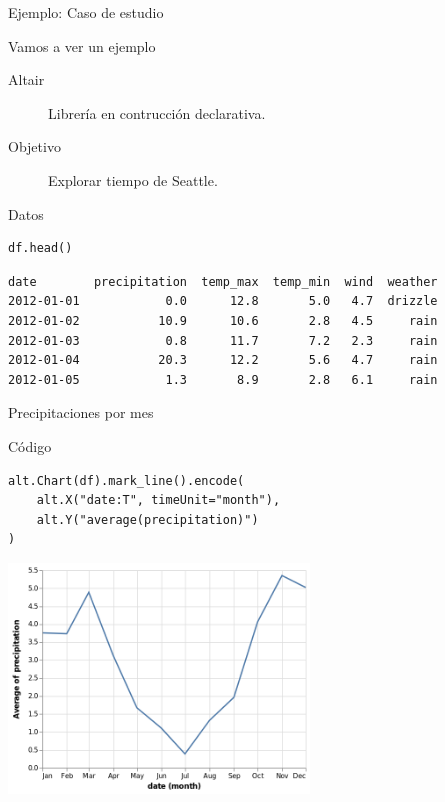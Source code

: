 \documentclass[bigger,unknownkeysallowed]{beamer}
\begin{document}
\begin{frame}[fragile,label={sec:org5759b16}]{Ejemplo: Caso de estudio}
 \begin{block}{Vamos a ver un ejemplo}
\begin{description}
\item[{Altair}] Librería en contrucción declarativa.

\item[{Objetivo}] Explorar tiempo de Seattle.
\end{description}
\end{block}

\begin{block}{Datos}
\lstset{language=Python,label=orgfd9d42b,caption= ,captionpos=b,numbers=none}
\begin{lstlisting}
df.head()
\end{lstlisting}
\scriptsize
\lstset{language=sh,label= ,caption= ,captionpos=b,numbers=none}
\begin{lstlisting}
date        precipitation  temp_max  temp_min  wind  weather
2012-01-01            0.0      12.8       5.0   4.7  drizzle
2012-01-02           10.9      10.6       2.8   4.5     rain
2012-01-03            0.8      11.7       7.2   2.3     rain
2012-01-04           20.3      12.2       5.6   4.7     rain
2012-01-05            1.3       8.9       2.8   6.1     rain
\end{lstlisting}
\end{block}
\end{frame}

\begin{frame}[fragile,label={sec:org7acd747}]{Precipitaciones por mes}
 \begin{block}{Código}
\begin{center}
\lstset{language=Python,label= ,caption= ,captionpos=b,numbers=none}
\begin{lstlisting}
alt.Chart(df).mark_line().encode(
    alt.X("date:T", timeUnit="month"),
    alt.Y("average(precipitation)")
)
\end{lstlisting}
\end{center}
\end{block}
\begin{center}
\begin{center}
\includegraphics[width=0.6\textwidth]{seattle2.png}
\end{center}
\end{center}
\end{frame}
\end{document}
